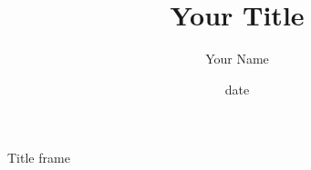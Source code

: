 \documentclass[xcolor=svgnames]{beamer}
\begin{document}
\title[Your Title\hspace{14em}\insertframenumber/\inserttotalframenumber]
{Your Title}

\author{Your Name}
\date{date}
\begin{frame}{Title frame}


\end{frame}
\end{document}
